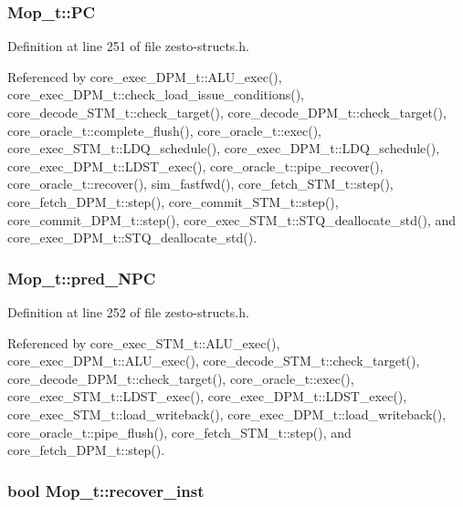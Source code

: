 \subsubsection[{PC}]{ {\bf Mop\_\-t::PC}}\label{structMop__t_5645e3dfe55b1b6b2206ffb38379c44d}




Definition at line 251 of file zesto-structs.h.

Referenced by core\_\-exec\_\-DPM\_\-t::ALU\_\-exec(), core\_\-exec\_\-DPM\_\-t::check\_\-load\_\-issue\_\-conditions(), core\_\-decode\_\-STM\_\-t::check\_\-target(), core\_\-decode\_\-DPM\_\-t::check\_\-target(), core\_\-oracle\_\-t::complete\_\-flush(), core\_\-oracle\_\-t::exec(), core\_\-exec\_\-STM\_\-t::LDQ\_\-schedule(), core\_\-exec\_\-DPM\_\-t::LDQ\_\-schedule(), core\_\-exec\_\-DPM\_\-t::LDST\_\-exec(), core\_\-oracle\_\-t::pipe\_\-recover(), core\_\-oracle\_\-t::recover(), sim\_\-fastfwd(), core\_\-fetch\_\-STM\_\-t::step(), core\_\-fetch\_\-DPM\_\-t::step(), core\_\-commit\_\-STM\_\-t::step(), core\_\-commit\_\-DPM\_\-t::step(), core\_\-exec\_\-STM\_\-t::STQ\_\-deallocate\_\-std(), and core\_\-exec\_\-DPM\_\-t::STQ\_\-deallocate\_\-std().
\subsubsection[{pred\_\-NPC}]{ {\bf Mop\_\-t::pred\_\-NPC}}\label{structMop__t_2337789f03bfd40d471eafa6e31b4b45}




Definition at line 252 of file zesto-structs.h.

Referenced by core\_\-exec\_\-STM\_\-t::ALU\_\-exec(), core\_\-exec\_\-DPM\_\-t::ALU\_\-exec(), core\_\-decode\_\-STM\_\-t::check\_\-target(), core\_\-decode\_\-DPM\_\-t::check\_\-target(), core\_\-oracle\_\-t::exec(), core\_\-exec\_\-STM\_\-t::LDST\_\-exec(), core\_\-exec\_\-DPM\_\-t::LDST\_\-exec(), core\_\-exec\_\-STM\_\-t::load\_\-writeback(), core\_\-exec\_\-DPM\_\-t::load\_\-writeback(), core\_\-oracle\_\-t::pipe\_\-flush(), core\_\-fetch\_\-STM\_\-t::step(), and core\_\-fetch\_\-DPM\_\-t::step().
\subsubsection[{recover\_\-inst}]{\setlength{\rightskip}{0pt plus 5cm}bool {\bf Mop\_\-t::recover\_\-inst}}\label{structMop__t_91414c4b76b4a38c6ee3629b949c01c4}




